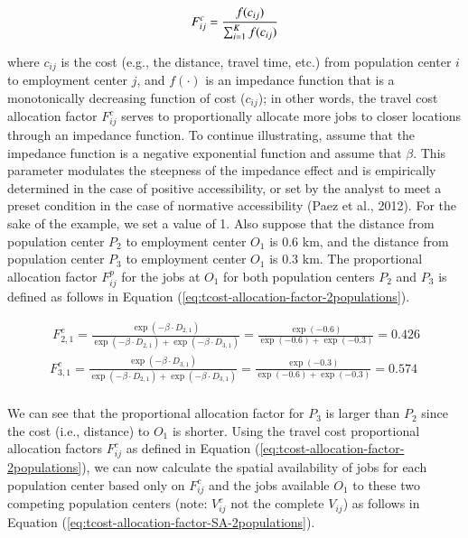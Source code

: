 \documentclass[]{elsarticle} %
\begin{document}
\begin{equation}
\label{eq:tcost-alloc-factor}
F^c_{ij} = \frac{f(c_{ij})}{\sum_{i=1}^K f(c_{ij})}\\
\end{equation}

\noindent where \(c_{ij}\) is the cost (e.g., the distance, travel time,
etc.) from population center \(i\) to employment center \(j\), and
\(f(\cdot)\) is an impedance function that is a monotonically decreasing
function of cost (\(c_{ij}\)); in other words, the travel cost
allocation factor \(F^c_{ij}\) serves to proportionally allocate more
jobs to closer locations through an impedance function. To continue
illustrating, assume that the impedance function is a negative
exponential function and assume that \(\beta\). This parameter modulates
the steepness of the impedance effect and is empirically determined in
the case of positive accessibility, or set by the analyst to meet a
preset condition in the case of normative accessibility (Paez et al.,
2012). For the sake of the example, we set a value of 1. Also suppose
that the distance from population center \(P_2\) to employment center
\(O_1\) is 0.6 km, and the distance from population center \(P_3\) to
employment center \(O_1\) is 0.3 km. The proportional allocation factor
\(F^p_{ij}\) for the jobs at \(O_1\) for both population centers \(P_2\)
and \(P_3\) is defined as follows in Equation
(\ref{eq:tcost-allocation-factor-2populations}).

\begin{equation}
\label{eq:tcost-allocation-factor-2populations}
\begin{array}{l}\
F^c_{2,1} = \frac{\exp(-\beta \cdot D_{2,1})}{\exp(-\beta \cdot D_{2,1}) + \exp(-\beta \cdot D_{3,1})} = \frac{\exp(-0.6)}{\exp(-0.6) + \exp(-0.3)} = 0.426\\
F^c_{3,1} = \frac{\exp(-\beta \cdot D_{3,1})}{\exp(-\beta \cdot D_{2,1}) + \exp(-\beta \cdot D_{3,1})}  = \frac{\exp(-0.3)}{\exp(-0.6) + \exp(-0.3)} = 0.574\\
\end{array}
\end{equation}

We can see that the proportional allocation factor for \(P_3\) is larger
than \(P_2\) since the cost (i.e., distance) to \(O_1\) is shorter.
Using the travel cost proportional allocation factors \(F^c_{ij}\) as
defined in Equation (\ref{eq:tcost-allocation-factor-2populations}), we
can now calculate the spatial availability of jobs for each population
center based only on \(F^c_{ij}\) and the jobs available \(O_1\) to
these two competing population centers (note: \(V^c_{ij}\) not the
complete \(V_{ij}\)) as follows in Equation
(\ref{eq:tcost-allocation-factor-SA-2populations}).
\end{document}

